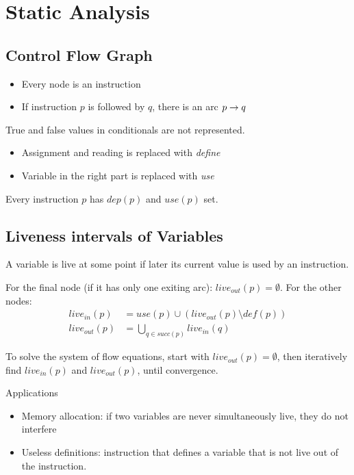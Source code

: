 \section{Static Analysis}

\subsection{Control Flow Graph}
\begin{itemize}
    \item Every node is an instruction
    \item If instruction $p$ is followed by $q$, there is an arc $p\rightarrow q$
\end{itemize}

True and false values in conditionals are not represented.
\begin{itemize}
    \item Assignment and reading is replaced with \emph{define}
    \item Variable in the right part is replaced with \emph{use}
\end{itemize}

Every instruction $p$ has $dep(p)$ and $use(p)$ set.

\subsection{Liveness intervals of Variables}
A variable is live at some point if later its current value is used by an instruction.

For the final node (if it has only one exiting arc): $live_{out}(p) = \emptyset$. For the other nodes:
\begin{align*}
    live_{in}(p) &= use(p) \cup (live_{out}(p) \setminus def(p)) \\
    live_{out}(p) &= \bigcup_{q\in succ(p)} live_{in}(q)
\end{align*}

To solve the system of flow equations, start with $live_{out}(p) = \emptyset$, then iteratively find $live_{in}(p)$ and $live_{out}(p)$, until convergence.

Applications
\begin{itemize}
    \item Memory allocation: if two variables are never simultaneously live, they do not interfere
    \item Useless definitions: instruction that defines a variable that is not live out of the instruction.
\end{itemize}

